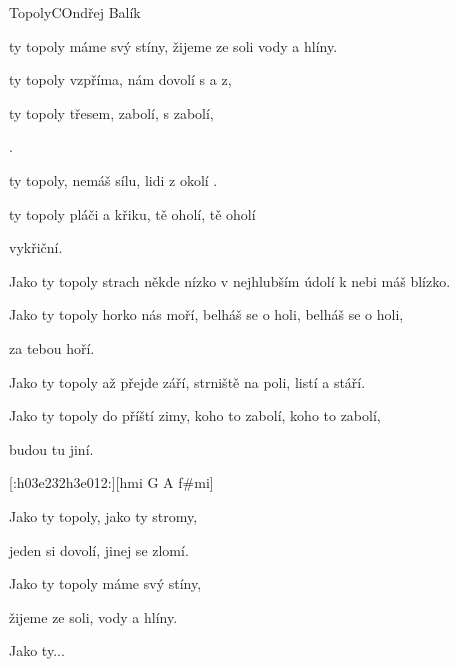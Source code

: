 \setcounter{page}{89}
\begin{song}{Topoly}{C}{Ondřej Balík}
\begin{footnotesize}
\begin{SBChorus*}
 ty topoly máme svý stíny, žijeme ze soli vody a hlíny.
\end{SBChorus*}
\begin{SBVerse}
 ty topoly  vzpříma,  nám dovolí s a z,

 ty topoly  třesem,  zabolí, s zabolí,

 .

 ty topoly,  nemáš sílu,  lidi z okolí  .

 ty topoly  pláči a křiku,  tě oholí,  tě oholí

 vykřiční.
\end{SBVerse}
\begin{SBVerse}
Jako ty topoly strach někde nízko v nejhlubším údolí k nebi máš blízko.

Jako ty topoly horko nás moří, belháš se o holi, belháš se o holi,

za tebou hoří.

Jako ty topoly až přejde září, strniště na poli, listí a stáří.

Jako ty topoly do příští zimy, koho to zabolí, koho to zabolí,

budou tu jiní.
\end{SBVerse}
[:h03e232h3e012:][hmi G A f\#mi]
\begin{SBVerse}
Jako ty topoly, jako ty stromy,

jeden si dovolí, jinej se zlomí.

Jako ty topoly máme svý stíny,

žijeme ze soli, vody a hlíny.

Jako ty...
\end{SBVerse}
\end{footnotesize}
\end{song}

\pagebreak
